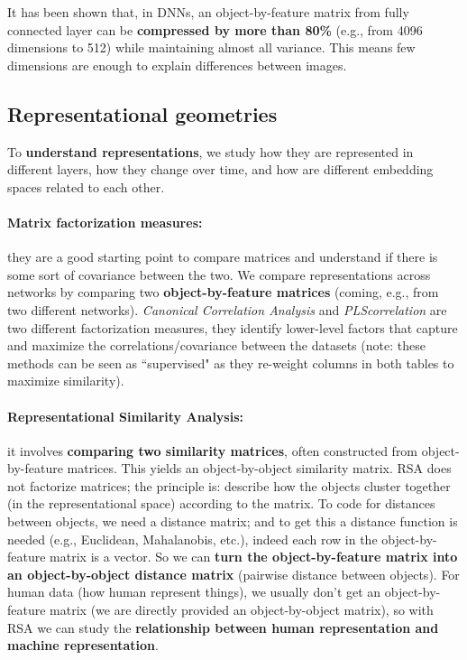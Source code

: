 It has been shown that, in DNNs, an object-by-feature matrix from fully connected layer can be \textbf{compressed by more than 80\%} (e.g., from 4096 dimensions to 512) while maintaining almost all variance. This means few dimensions are enough to explain differences between images. 

\subsection{Representational geometries}
To \textbf{understand representations}, we study how they are represented in different layers, how they change over time, and how are different embedding spaces related to each other.

\paragraph{Matrix factorization measures:} they are a good starting point to compare matrices and understand if there is some sort of covariance between the two. We compare representations across networks by comparing two \textbf{object-by-feature matrices} (coming, e.g., from two different networks). \textit{Canonical Correlation Analysis} and \textit{PLScorrelation} are two different factorization measures, they identify lower-level factors that capture and maximize the correlations/covariance between the datasets (note: these methods can be seen as ``supervised" as they re-weight columns in both tables to maximize similarity).

\paragraph{Representational Similarity Analysis:} it involves \textbf{comparing two similarity matrices}, often constructed from object-by-feature matrices. This yields an object-by-object similarity matrix.
RSA does not factorize matrices; the principle is: describe how the objects cluster together (in the representational space) according to the matrix. To code for distances between objects, we need a distance matrix; and to get this a distance function is needed (e.g., Euclidean, Mahalanobis, etc.), indeed each row in the object-by-feature matrix is a vector. So we can \textbf{turn the object-by-feature matrix into an object-by-object distance matrix} (pairwise distance between objects).
For human data (how human represent things), we usually don't get an object-by-feature matrix (we are directly provided an object-by-object matrix), so with RSA we can study the \textbf{relationship between human representation and machine representation}.

